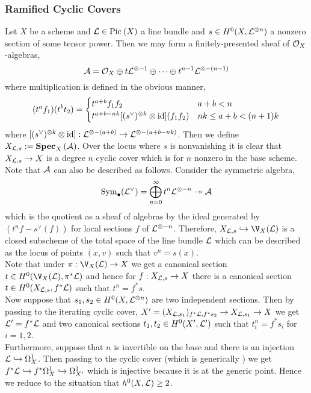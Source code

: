 \documentclass[12pt]{article}
\begin{document}
\subsubsection{Ramified Cyclic Covers}

Let $X$ be a scheme and $\mathcal{L} \in \mathrm{Pic}^{} \left( X \right)$ a line bundle and $s \in H^0(X, \mathcal{L}^{\otimes n})$ a nonzero section of some tensor power. Then we may form a finitely-presented sheaf of $\mathcal{O}_{X}$-algebras,
\[ \mathcal{A} = \mathcal{O}_{X} \oplus t \mathcal{L}^{\otimes -1} \oplus \cdots \oplus t^{n-1} \mathcal{L}^{\otimes -(n-1)} \]
where multiplication is defined in the obvious manner,
\[ (t^a f_1) (t^b t_2)  = 
\begin{cases}
t^{a+b} f_1 f_2 & a + b < n
\\
t^{a + b - nk} [(s^\vee)^{\otimes k} \otimes \mathrm{id}](f_1 f_2) & nk \le a + b < (n+1)k
\end{cases}  \]
where $[(s^\vee)^{\otimes k} \otimes \mathrm{id}] : \mathcal{L}^{\otimes -(a+b)} \to \mathcal{L}^{\otimes -(a + b - nk)}$. Then we define $X_{\mathcal{L}, s} := \mathbf{Spec}_{X}\left( \mathcal{A} \right)$. Over the locus where $s$ is nonvanishing it is clear that $X_{\mathcal{L}, s} \to X$ is a degree $n$ cyclic cover which is \etale for $n$ nonzero in the base scheme. 
\bigskip\\
Note that $\mathcal{A}$ can also be described as follows. Consider the symmetric algebra,
\[ \mathrm{Sym}_{\bullet}\! \left( \mathcal{L}^\vee \right) = \bigoplus_{n = 0}^\infty t^n \mathcal{L}^{\otimes -n} \twoheadrightarrow \mathcal{A} \]
which is the quotient as a sheaf of algebras by the ideal generated by $(t^n f - s^\vee(f))$ for local sections $f$ of $\mathcal{L}^{\otimes -n}$. Therefore, $X_{\L, s} \embed \V_X(\L)$ is a closed subscheme of the total space of the line bundle $\mathcal{L}$ which can be described as the locus of points $(x, v)$ such that $v^n = s(x)$.
\bigskip\\
Note that under $\pi : \V_X(\L) \to X$ we get a canonical section $t \in H^0(\V_X(\L), \pi^* \L)$ and hence for $f : X_{\mathcal{L}, s} \to X$ there is a canonical section $t \in H^0(X_{\mathcal{L}, s}, f^* \mathcal{L})$ such that $t^n = f^* s$. 
\bigskip\\
Now suppose that $s_1, s_2 \in H^0(X, \mathcal{L}^{\otimes n})$ are two independent sections. Then by passing to the iterating cyclic cover, $X' = (X_{\mathcal{L}, s_1})_{f^* \mathcal{L}, f^* s_2} \to X_{\mathcal{L}, s_1} \to X$ we get $\mathcal{L}' = f^* \mathcal{L}$ and two canonical sections $t_1, t_2 \in H^0(X', \mathcal{L}')$ such that $t_i^n = f^* s_i$ for $i = 1,2$. 
\bigskip\\
Furthermore, suppose that $n$ is invertible on the base and there is an injection $\mathcal{L} \hookrightarrow \Omega_X^1$. Then passing to the cyclic cover (which is generically \etale) we get $f^* \mathcal{L} \hookrightarrow f^* \Omega_X^1 \hookrightarrow \Omega_{X'}^1$ which is injective because it is at the generic point. Hence we reduce to the situation that $h^0(X, \mathcal{L}) \ge 2$.



 
\end{document}
